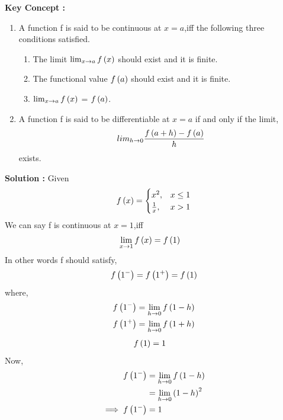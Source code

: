 \documentclass[journal,12pt,twocolumn]{IEEEtran}
\begin{document}
 \textbf{ Key Concept : }
  \begin{enumerate}
      \item  A function f is said to be continuous at $x = a$,iff the following three conditions satisfied. 
            \begin{enumerate}[label=\roman*]
                \item The limit $\lim_{x \to a}f\left(x\right)$ should exist and it is finite.
                \item The functional value $f\left(a\right)$ should exist and it is finite.
                \item $\lim_{x \to a}f\left(x\right)$ = $f\left(a\right)$.
            \end{enumerate}
      \item  A function f is said to be differentiable at $x=a$ if and only if the limit,
           \[
               lim_{h \to 0}\frac{f\left(a + h\right) - f\left(a\right)}{h}
           \]  exists.
                 
  \end{enumerate}
 \textbf{ Solution :}
  Given  
            \begin{equation*} 
                 f\left(x\right)  = \begin{cases}
                              x^2,  & x \leq 1 \\
                              \frac{1}{x} , & x  >  1
                           \end{cases}
            \end{equation*}  
   We can say f is continuous at $x = 1$,iff 
            \begin{align}
                 \lim_{x \to 1}f\left(x\right) &= f\left(1\right)
            \end{align}
    In other words f should satisfy,
            \begin{align}
                 f\left(1^-\right) =f\left(1^+\right) =f\left(1\right) 
            \end{align}
    where,
            \begin{align}
                 f\left(1^-\right) &=  \lim_{h\to0}f\left(1-h\right)\\
                 f\left(1^+\right) &=  \lim_{h\to0}f\left(1+h\right)
            \end{align}
            \begin{align}
                 f\left(1\right) &= 1\label{eq 5}
            \end{align}
    Now,
            \begin{align}
                 f\left(1^-\right)  &= \lim_{h\to0}f\left(1-h\right)\\
                                    &= \lim_{h\to0}  \left(1-h\right)^2\\
                 \implies f\left(1^-\right) &= 1\label{eq 8}
            \end{align}
\end{document}
